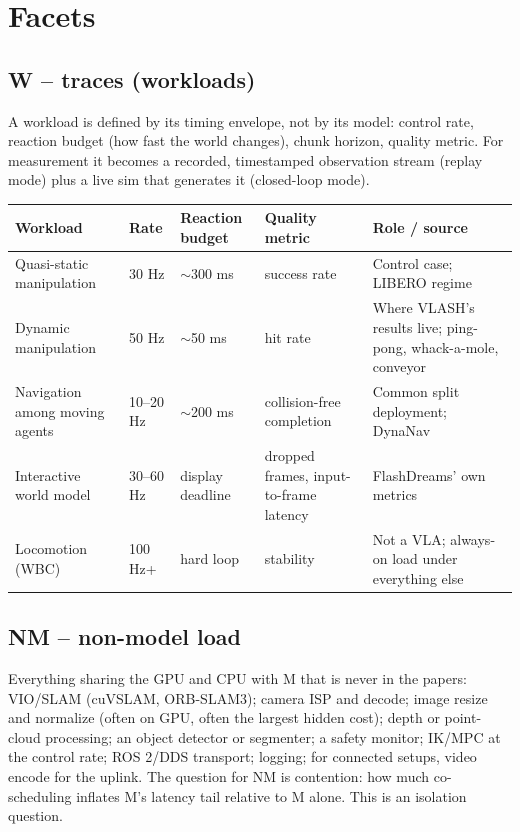 \documentclass[10pt,letterpaper]{article}
\begin{document}
\section{Facets}

\subsection{W -- traces (workloads)}

A workload is defined by its timing envelope, not by its model: control rate, reaction budget (how fast the world changes), chunk horizon, quality metric. For measurement it becomes a recorded, timestamped observation stream (replay mode) plus a live sim that generates it (closed-loop mode).

\begin{center}
\small
\begin{tabular}{@{}L{3.1cm}L{1.3cm}L{1.9cm}L{2.9cm}L{4.9cm}@{}}
\toprule
Workload & Rate & Reaction budget & Quality metric & Role / source \\
\midrule
Quasi-static manipulation & 30 Hz & $\sim$300 ms & success rate & Control case; LIBERO regime \\
Dynamic manipulation & 50 Hz & $\sim$50 ms & hit rate & Where VLASH's results live; ping-pong, whack-a-mole, conveyor \\
Navigation among moving agents & 10--20 Hz & $\sim$200 ms & collision-free completion & Common split deployment; DynaNav \\
Interactive world model & 30--60 Hz & display deadline & dropped frames, input-to-frame latency & FlashDreams' own metrics \\
Locomotion (WBC) & 100 Hz+ & hard loop & stability & Not a VLA; always-on load under everything else \\
\bottomrule
\end{tabular}
\end{center}

\subsection{NM -- non-model load}

Everything sharing the GPU and CPU with M that is never in the papers: VIO/SLAM (cuVSLAM, ORB-SLAM3); camera ISP and decode; image resize and normalize (often on GPU, often the largest hidden cost); depth or point-cloud processing; an object detector or segmenter; a safety monitor; IK/MPC at the control rate; ROS 2/DDS transport; logging; for connected setups, video encode for the uplink. The question for NM is contention: how much co-scheduling inflates M's latency tail relative to M alone. This is an isolation question.
\end{document}
